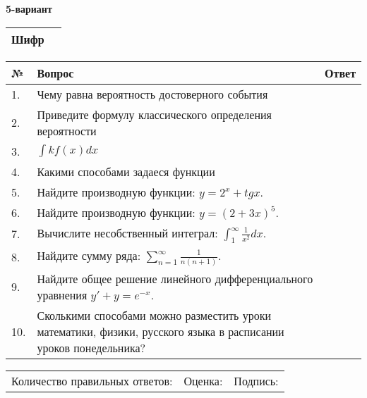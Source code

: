 \documentclass{article}
\begin{document}
  \egroup
  
  \newpage
  
  
  \textbf{5-вариант}\\
  
  \bgroup
  \def\arraystretch{1.6} %
  
  \begin{tabular}{|m{5.7cm}|m{9.5cm}|}
  \hline
  Шифр & \\
  \hline
  \end{tabular}
  
  \vspace{1cm}
  
  \begin{tabular}{|m{0.7cm}|m{10cm}|m{4cm}|}
  \hline
  № & Вопрос & Ответ \\
  \hline
  1. & Чему равна вероятность достоверного события &  \\
  \hline
  2. & Приведите формулу классического определения вероятности &  \\
  \hline
  3. & \(\int{kf(x)}dx\) &  \\
  \hline
  4. & Какими способами задаеся функции &  \\
  \hline
  5. & Найдите производную функции: \(y = 2^{x} + tgx\). &  \\
  \hline
  6. & Найдите производную функции: \(y = (2 + 3x)^{5}\). &  \\
  \hline
  7. & Вычислите несобственный интеграл: \(\int_{1}^{\infty}{\frac{1}{x^{2}}dx}\). &  \\
  \hline
  8. & Найдите сумму ряда: \(\sum_{n = 1}^{\infty}\frac{1}{n(n + 1)}\). &  \\
  \hline
  9. & Найдите общее решение линейного дифференциального уравнения \(y' + y = e^{- x}\). &  \\
  \hline
  10. & Сколькими способами можно разместить уроки математики, физики, русского языка в расписании уроков понедельника? &  \\
  \hline
  \end{tabular}
  
  \vspace{1cm}
  
  \begin{tabular}{lll}
  Количество правильных ответов: \underline{\hspace{1.5cm}} & 
  Оценка: \underline{\hspace{1.5cm}} & 
  Подпись: \underline{\hspace{2cm}} \\
  \end{tabular}
  
\end{document}
